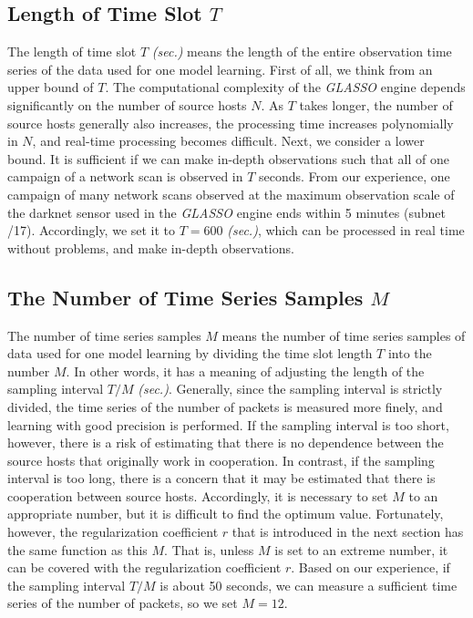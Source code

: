 \documentclass[conference]{IEEEtran}
\begin{document}
\subsection{Length of Time Slot $T$}
The length of time slot $T$ \textit{(sec.)} means the length of the entire observation time series of the data used for one model learning.
First of all, we think from an upper bound of $T$.
The computational complexity of the \textit{GLASSO} engine depends significantly on the number of source hosts $N$.
As $T$ takes longer, the number of source hosts generally also increases, the processing time increases polynomially in $N$, and real-time processing becomes difficult.
Next, we consider a lower bound.
It is sufficient if we can make in-depth observations such that all of one campaign of a network scan is observed in $T$ seconds.
From our experience, one campaign of many network scans observed at the maximum observation scale of the darknet sensor used in the \textit{GLASSO} engine ends within 5 minutes (subnet /17).
Accordingly, we set it to $T=600$ \textit{(sec.)}, which can be processed in real time without problems, and make in-depth observations.



\subsection{The Number of Time Series Samples $M$}
The number of time series samples $M$ means the number of time series samples of data used for one model learning by dividing the time slot length $T$ into the number $M$.
In other words, it has a meaning of adjusting the length of the sampling interval $T/M$ \textit{(sec.)}.
Generally, since the sampling interval is strictly divided, the time series of the number of packets is measured more finely, and learning with good precision is performed.
If the sampling interval is too short, however, there is a risk of estimating that there is no dependence between the source hosts that originally work in cooperation.
In contrast, if the sampling interval is too long, there is a concern that it may be estimated that there is cooperation between source hosts.
Accordingly, it is necessary to set $M$ to an appropriate number, but it is difficult to find the optimum value.
Fortunately, however, the regularization coefficient $r$ that is introduced in the next section has the same function as this $M$.
That is, unless $M$ is set to an extreme number, it can be covered with the regularization coefficient $r$.
Based on our experience, if the sampling interval $T/M$ is about 50 seconds, we can measure a sufficient time series of the number of packets, so we set $M=12$.
\end{document}
